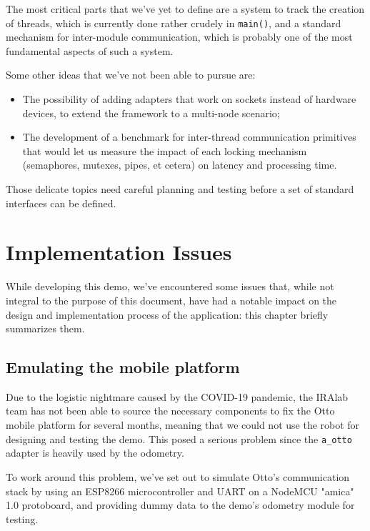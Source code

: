 \documentclass[a4paper,12pt]{report}
\begin{document}
The most critical parts that we've yet to define are a system to track the creation of threads, which is currently done rather crudely in \texttt{main()}, and a standard mechanism for inter-module communication, which is probably one of the most fundamental aspects of such a system.

Some other ideas that we've not been able to pursue are:

\begin{itemize}
    \item The possibility of adding adapters that work on sockets instead of hardware devices, to extend the framework to a multi-node scenario;
    \item The development of a benchmark for inter-thread communication primitives that would let us measure the impact of each locking mechanism (semaphores, mutexes, pipes, et cetera) on latency and processing time.
\end{itemize}

Those delicate topics need careful planning and testing before a set of standard interfaces can be defined.

\newpage
\appendix
\chapter{Implementation Issues}

While developing this demo, we’ve encountered some issues that, while not integral to the purpose of this document, have had a notable impact on the design and implementation process of the application: this chapter briefly summarizes them.


\section{Emulating the mobile platform}

Due to the logistic nightmare caused by the COVID-19 pandemic, the IRAlab team has not been able to source the necessary components to fix the Otto mobile platform for several months, meaning that we could not use the robot for designing and testing the demo. This posed a serious problem since the \texttt{a\_otto} adapter is heavily used by the odometry.

To work around this problem, we've set out to simulate Otto's communication stack by using an ESP8266 microcontroller and UART on a NodeMCU "amica" 1.0 protoboard, and providing dummy data to the demo's odometry module for testing. 
\end{document}
